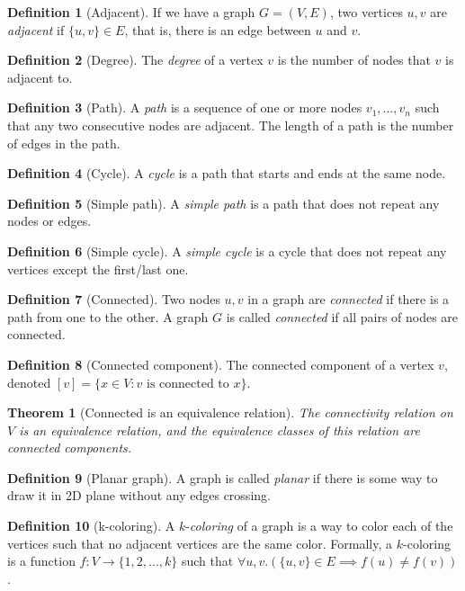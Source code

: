 \documentclass[12pt]{article}
\newtheorem{theorem}{Theorem}[section]
\theoremstyle{definition}
\newtheorem{definition}{Definition}[section]
\begin{document}
\begin{definition}[Adjacent]
    If we have a graph $G = (V, E)$, two vertices $u, v$ are \emph{adjacent} if $\{u, v\} \in E$, that is, there is an edge between $u$ and $v$.
\end{definition}
\begin{definition}[Degree]
    The \emph{degree} of a vertex $v$ is the number of nodes that $v$ is adjacent to.
\end{definition}
\begin{definition}[Path]
    A \emph{path} is a sequence of one or more nodes $v_1,...,v_n$ such that any two consecutive nodes are adjacent. The length of a path is the number of edges in the path.
\end{definition}
\begin{definition}[Cycle]
    A \emph{cycle} is a path that starts and ends at the same node.
\end{definition}
\begin{definition}[Simple path]
    A \emph{simple path} is a path that does not repeat any nodes or edges.
\end{definition}
\begin{definition}[Simple cycle]
    A \emph{simple cycle} is a cycle that does not repeat any vertices except the first/last one.
\end{definition}
\begin{definition}[Connected]
    Two nodes $u, v$ in a graph are \emph{connected} if there is a path from one to the other. A graph $G$ is called \emph{connected} if all pairs of nodes are connected.
\end{definition}
\begin{definition}[Connected component]
    The connected component of a vertex $v$, denoted $[v] = \{x \in V: v \text{ is connected to } x\}$.
\end{definition}
\begin{theorem}[Connected is an equivalence relation]
    The connectivity relation on $V$ is an equivalence relation, and the equivalence classes of this relation are connected components.
\end{theorem}
\begin{definition}[Planar graph]
    A graph is called \emph{planar} if there is some way to draw it in 2D plane without any edges crossing.
\end{definition}
\begin{definition}[k-coloring]
    A $k$-\emph{coloring} of a graph is a way to color each of the vertices such that no adjacent vertices are the same color. Formally, a $k$-coloring is a function $f: V \to \{1, 2, ...,k\}$ such that $\forall u, v.(\{u, v\}\in E \implies f(u) \neq f(v))$.
\end{definition}
\end{document}

